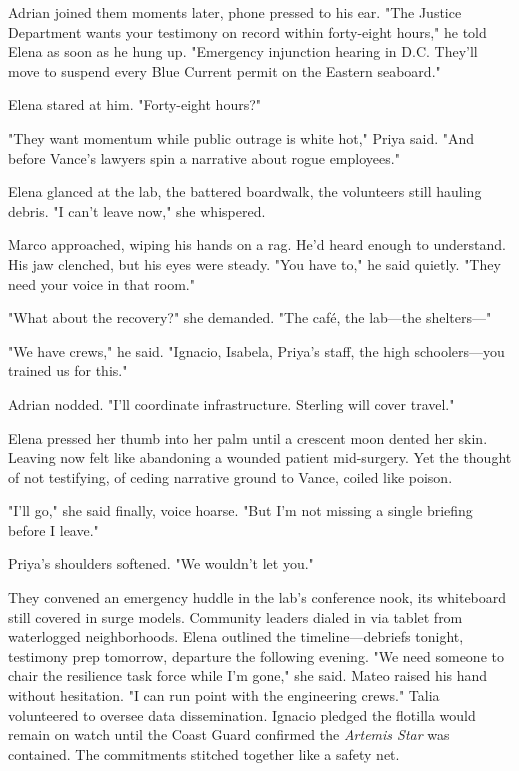 Adrian joined them moments later, phone pressed to his ear. "The Justice Department wants your testimony on record within forty-eight hours," he told Elena as soon as he hung up. "Emergency injunction hearing in D.C. They'll move to suspend every Blue Current permit on the Eastern seaboard."

Elena stared at him. "Forty-eight hours?"

"They want momentum while public outrage is white hot," Priya said. "And before Vance's lawyers spin a narrative about rogue employees."

Elena glanced at the lab, the battered boardwalk, the volunteers still hauling debris. "I can't leave now," she whispered.

Marco approached, wiping his hands on a rag. He'd heard enough to understand. His jaw clenched, but his eyes were steady. "You have to," he said quietly. "They need your voice in that room."

"What about the recovery?" she demanded. "The café, the lab—the shelters—"

"We have crews," he said. "Ignacio, Isabela, Priya's staff, the high schoolers—you trained us for this."

Adrian nodded. "I'll coordinate infrastructure. Sterling will cover travel."

Elena pressed her thumb into her palm until a crescent moon dented her skin. Leaving now felt like abandoning a wounded patient mid-surgery. Yet the thought of not testifying, of ceding narrative ground to Vance, coiled like poison.

"I'll go," she said finally, voice hoarse. "But I'm not missing a single briefing before I leave."

Priya's shoulders softened. "We wouldn't let you."

They convened an emergency huddle in the lab's conference nook, its whiteboard still covered in surge models. Community leaders dialed in via tablet from waterlogged neighborhoods. Elena outlined the timeline—debriefs tonight, testimony prep tomorrow, departure the following evening. "We need someone to chair the resilience task force while I'm gone," she said. Mateo raised his hand without hesitation. "I can run point with the engineering crews." Talia volunteered to oversee data dissemination. Ignacio pledged the flotilla would remain on watch until the Coast Guard confirmed the \textit{Artemis Star} was contained. The commitments stitched together like a safety net.

\bigskip

